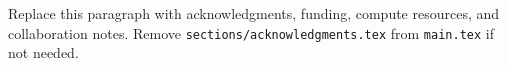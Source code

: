 \begin{acknowledgments}
Replace this paragraph with acknowledgments, funding, compute resources, and collaboration notes. Remove \texttt{sections/acknowledgments.tex} from \texttt{main.tex} if not needed.
\end{acknowledgments}
